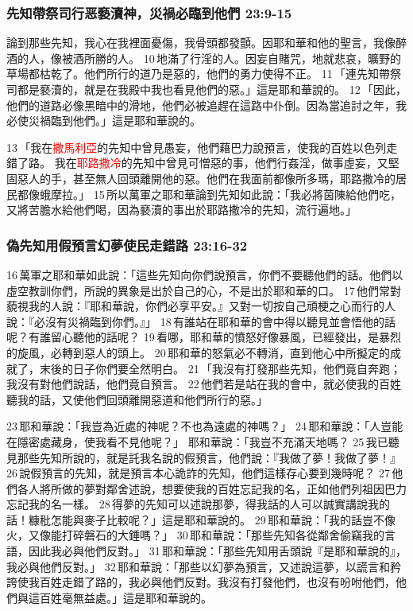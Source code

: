 \subsubsection{先知帶祭司行恶褻瀆神，災禍必臨到他們 23:9-15}
論到那些先知，我心在我裡面憂傷，我骨頭都發顫。因耶和華和他的聖言，我像醉酒的人，像被酒所勝的人。 10 地滿了行淫的人。因妄自賭咒，地就悲哀，曠野的草場都枯乾了。他們所行的道乃是惡的，他們的勇力使得不正。 11 「連先知帶祭司都是褻瀆的，就是在我殿中我也看見他們的惡。」這是耶和華說的。 12 「因此，他們的道路必像黑暗中的滑地，他們必被追趕在這路中仆倒。因為當追討之年，我必使災禍臨到他們。」這是耶和華說的。

13 「我在\textcolor{red}{撒馬利亞}的先知中曾見愚妄，他們藉巴力說預言，使我的百姓以色列走錯了路。 
我在\textcolor{red}{耶路撒冷}的先知中曾見可憎惡的事，他們行姦淫，做事虛妄，又堅固惡人的手，甚至無人回頭離開他的惡。他們在我面前都像所多瑪，耶路撒冷的居民都像蛾摩拉。」 15 所以萬軍之耶和華論到先知如此說：「我必將茵陳給他們吃，又將苦膽水給他們喝，因為褻瀆的事出於耶路撒冷的先知，流行遍地。」


\subsubsection{偽先知用假預言幻夢使民走錯路 23:16-32}
16 萬軍之耶和華如此說：「這些先知向你們說預言，你們不要聽他們的話。他們以虛空教訓你們，所說的異象是出於自己的心，不是出於耶和華的口。 17 他們常對藐視我的人說：『耶和華說，你們必享平安。』又對一切按自己頑梗之心而行的人說：『必沒有災禍臨到你們。』」 18 有誰站在耶和華的會中得以聽見並會悟他的話呢？有誰留心聽他的話呢？ 19 看哪，耶和華的憤怒好像暴風，已經發出，是暴烈的旋風，必轉到惡人的頭上。 20 耶和華的怒氣必不轉消，直到他心中所擬定的成就了，末後的日子你們要全然明白。 21 「我沒有打發那些先知，他們竟自奔跑；我沒有對他們說話，他們竟自預言。 22 他們若是站在我的會中，就必使我的百姓聽我的話，又使他們回頭離開惡道和他們所行的惡。」


23 耶和華說：「我豈為近處的神呢？不也為遠處的神嗎？」 
24 耶和華說：「人豈能在隱密處藏身，使我看不見他呢？」
耶和華說：「我豈不充滿天地嗎？ 25 我已聽見那些先知所說的，就是託我名說的假預言，他們說：『我做了夢！我做了夢！』 26 說假預言的先知，就是預言本心詭詐的先知，他們這樣存心要到幾時呢？ 27 他們各人將所做的夢對鄰舍述說，想要使我的百姓忘記我的名，正如他們列祖因巴力忘記我的名一樣。 28 得夢的先知可以述說那夢，得我話的人可以誠實講說我的話！糠秕怎能與麥子比較呢？」這是耶和華說的。 
29 耶和華說：「我的話豈不像火，又像能打碎磐石的大錘嗎？」 
30 耶和華說：「那些先知各從鄰舍偷竊我的言語，因此我必與他們反對。」 
31 耶和華說：「那些先知用舌頭說『是耶和華說的』，我必與他們反對。」 
32 耶和華說：「那些以幻夢為預言，又述說這夢，以謊言和矜誇使我百姓走錯了路的，我必與他們反對。我沒有打發他們，也沒有吩咐他們，他們與這百姓毫無益處。」這是耶和華說的。

